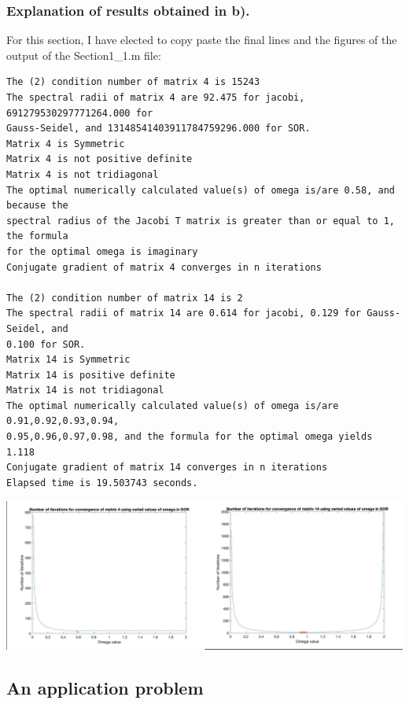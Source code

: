\documentclass{article}
\begin{document}
\subsubsection{Explanation of results obtained in b).}
For this section, I have elected to copy paste the final lines and the figures of the output of the Section1\_1.m file:
\begin{center}
    \begin{verbatim}
The (2) condition number of matrix 4 is 15243
The spectral radii of matrix 4 are 92.475 for jacobi, 691279530297771264.000 for
Gauss-Seidel, and 13148541403911784759296.000 for SOR.
Matrix 4 is Symmetric
Matrix 4 is not positive definite
Matrix 4 is not tridiagonal
The optimal numerically calculated value(s) of omega is/are 0.58, and because the
spectral radius of the Jacobi T matrix is greater than or equal to 1, the formula
for the optimal omega is imaginary
Conjugate gradient of matrix 4 converges in n iterations

The (2) condition number of matrix 14 is 2
The spectral radii of matrix 14 are 0.614 for jacobi, 0.129 for Gauss-Seidel, and
0.100 for SOR.
Matrix 14 is Symmetric
Matrix 14 is positive definite
Matrix 14 is not tridiagonal
The optimal numerically calculated value(s) of omega is/are 0.91,0.92,0.93,0.94,
0.95,0.96,0.97,0.98, and the formula for the optimal omega yields 1.118
Conjugate gradient of matrix 14 converges in n iterations
Elapsed time is 19.503743 seconds.
    \end{verbatim}
 \includegraphics[width=150mm,scale=0.5]{Figure1.png}
\end{center}
\subsection{An application problem}
\end{document}
